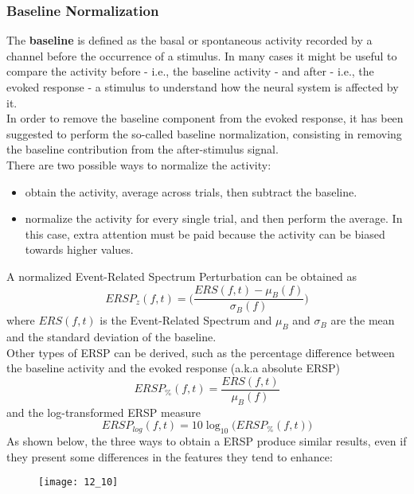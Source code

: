 \subsubsection{Baseline Normalization}
The \textbf{baseline} is defined as the basal or spontaneous
activity recorded by a channel before the occurrence of a stimulus. In many cases it might
be useful to compare the activity before - i.e., the baseline activity - and after - i.e., the
evoked response - a stimulus to understand how the neural system is affected by it.\\
In order to remove the baseline component from the evoked response, it has been suggested to
perform the so-called baseline normalization, consisting in removing the baseline contribution
from the after-stimulus signal.\\
There are two possible ways to normalize the activity:
\begin{itemize}
    \item obtain the activity, average across trials, then subtract the baseline.
    \item normalize the activity for every single trial, and then perform the average.
          In this case, extra attention must be paid because the activity can be biased towards
          higher values.
\end{itemize}
A normalized Event-Related Spectrum Perturbation can be
obtained as
\begin{equation*}
    ERSP_z(f,t)=\biggl(\frac{ERS(f,t)-\mu_B(f)}{\sigma_B(f)}\biggr)
\end{equation*}
where \(ERS(f,t)\) is the Event-Related Spectrum and \(\mu_B\) and \(\sigma_B\) are the mean and the
standard deviation of the baseline.\\
Other types of ERSP can be derived, such as the percentage difference between the baseline
activity and the evoked response (a.k.a absolute ERSP)
\begin{equation*}
    ERSP_{\%}(f,t)=\frac{ERS(f,t)}{\mu_{B}(f)}
\end{equation*}
and the log-transformed ERSP measure
\begin{equation*}
    ERSP_{log}(f,t)=10\log_{10}\bigl(ERSP_{\%}(f,t)\bigr)
\end{equation*}
As shown below, the three ways to obtain a ERSP produce similar results, even if they
present some differences in the features they tend to enhance:
\begin{figure}[H]
    \centering
    \texttt{[image: 12\_10]}
\end{figure}
